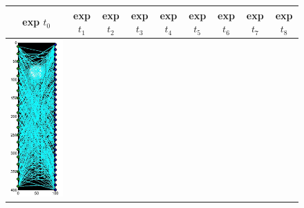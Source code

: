 \documentclass[11pt]{article}
\begin{document}
\begin{figure}[!h]
	\renewcommand{\arraystretch}{1.5}
	\begin{center}
		\iwidth=13mm
		\begin{tabular}{|c|c|c|c|c|c|c|c|c|}
			\hline		
			 exp $t_0$ & exp $t_1$ & exp $t_2$& exp $t_3$& exp $t_4$& exp $t_5$& exp $t_6$ & exp $t_7$ & exp $t_8$\\
			\hline		
			\includegraphics[width=.9\iwidth]{figures/newFigs/noisy/resultsExp-1-designs}

\end{tabular}
\end{center}
\end{figure}
\end{document}
